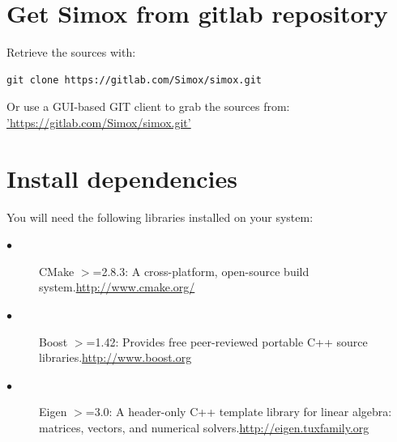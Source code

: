 \documentclass{book}
\begin{document}
\section{Get Simox from gitlab repository}
Retrieve the sources with: 
\begin{lstlisting}
git clone https://gitlab.com/Simox/simox.git
\end{lstlisting}
Or use a GUI-based GIT client to grab the sources from: 
\hyperref[simox gitlab]{'https://gitlab.com/Simox/simox.git'}
\section{Install dependencies}
You will need the following libraries installed on your system: 

\begin{description}
\item[$\bullet$ ] CMake $>$=2.8.3: A cross-platform, open-source build system.\hyperref[cmake]{http://www.cmake.org/} 
\item[$\bullet$ ] Boost $>$=1.42: Provides free peer-reviewed portable C++ source libraries.\hyperref[boost]{http://www.boost.org} 
\item[$\bullet$ ] Eigen $>$=3.0: A header-only C++ template library for linear algebra: matrices, vectors, and numerical solvers.\hyperref[Eigen]{http://eigen.tuxfamily.org} 
\end{description}
\end{document}
